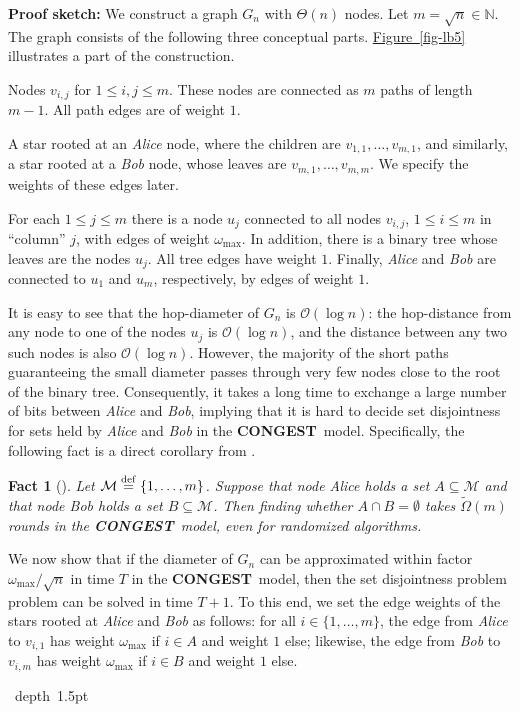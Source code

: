 \documentclass[letterpaper,11pt]{article}
\newcommand{\namedref}[2]{\hyperref[#2]{#1~\ref*{#2}}}
\newcommand{\figref}[1]{\namedref{Figure}{#1}}
\newtheorem{fact}{Fact}[section]
\newcommand{\blackslug}{\hbox{\hskip 1pt \vrule width 4pt height 8pt
depth 1.5pt \hskip 1pt}}
\newcommand{\QED}{\quad\blackslug\lower 8.5pt\null\par}
\newenvironment{proof}[1][Proof:]{\noindent \textbf{#1}\xspace}{\QED}
\newcommand{\N}{\mathbb{N}}
\newcommand{\BO}{\mathcal{O}}
\newcommand{\Set}[1]{\left\{ #1 \right\}}
\newcommand{\DEF}{\ensuremath{\stackrel{\rm def}{=}}}
\newcommand{\CONGEST}{\textbf{CONGEST}}
\newcommand{\cM}{\mathcal{M}}
\begin{document}
\begin{proof}[Proof sketch:]
  We construct a graph $G_n$ with $\Theta(n)$ nodes. Let $m=\sqrt n\in \N$. The
  graph consists of the following three conceptual parts. \figref{fig-lb5}
  illustrates a part of the construction.
  \begin{compactitem}
  \item Nodes $v_{i,j}$ for $1\le i,j\le m$. These nodes are connected
    as $m$ paths of length $m-1$. All path edges are of weight $1$.
  \item A star rooted at an \emph{Alice} node, where the children are
  $v_{1,1},\ldots,v_{m,1}$, and similarly, a star rooted at a \emph{Bob} node,
  whose leaves are $v_{m,1},\ldots,v_{m,m}$. We specify the weights of these
  edges later.
   \item For each $1\le j\le m$ there is a node $u_j$ connected to all
     nodes $v_{i,j}$, $1\le i\le m$ in ``column'' $j$, with edges of
     weight $\omega_{\max}$. In addition, there is a binary tree whose
     leaves are the nodes $u_j$. All tree edges have weight $1$. Finally, \emph{Alice}
     and \emph{Bob} are connected to $u_1$ and $u_m$, respectively, by edges of weight
     $1$.
  \end{compactitem}
It is easy to see that the hop-diameter of $G_n$ is $\BO(\log n)$:
the hop-distance from any node to one of the nodes $u_j$ is $\BO(\log n)$,
and the distance between any two such nodes is also $\BO(\log n)$.
However, the majority of the short paths guaranteeing the small diameter passes
through very few nodes close to the root of the binary tree. Consequently, it
takes a long time to exchange a large number of bits between \emph{Alice} and \emph{Bob}, implying
that it is hard to decide set disjointness for sets held
by \emph{Alice} and \emph{Bob} in the \CONGEST\ model. Specifically, the following fact is a
direct corollary from \cite{DHKNPPW-11}.
\begin{fact}[\cite{DHKNPPW-11}]
\label{lb-fact}
Let $\cM\DEF\Set{1,\ldots,m}$. Suppose that node \emph{Alice}
holds a set $A\subseteq\cM$ and that node \emph{Bob} holds a set
$B\subseteq\cM$. Then finding whether $A\cap B=\emptyset$ takes
$\tilde\Omega(m)$ rounds in the \CONGEST\ model, even for randomized algorithms.  
\end{fact}

We now show that if the diameter of $G_n$ can be approximated within factor
$\omega_{\max}/\sqrt n$ in time $T$ in the \CONGEST\ model, then the set
disjointness problem problem can be solved in time $T+1$. To this end, we set
the edge weights of the stars rooted at \emph{Alice} and \emph{Bob} as follows: for all $i\in
\{1,\ldots,m\}$, the edge from \emph{Alice} to $v_{i,1}$ has weight $\omega_{\max}$ if
$i\in A$ and weight $1$ else; likewise, the edge from \emph{Bob} to $v_{i,m}$ has
weight $\omega_{\max}$ if $i\in B$ and weight $1$ else.


\end{proof}
\end{document}
